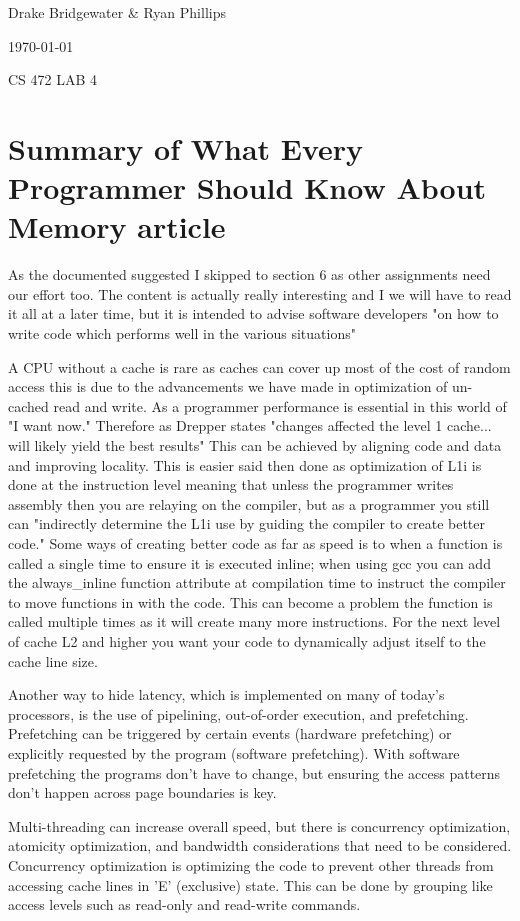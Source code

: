 \documentclass[letterpaper,12pt,titlepage]{article}
\def\name{Drake Bridgewater \& Ryan Phillips}
\begin{document}
\hfill \name

\hfill \today

\hfill CS 472 LAB 4

\section*{Summary of What Every Programmer Should Know About Memory article}
As the documented suggested I skipped to section 6 as other assignments need our effort too. The content is actually really interesting and I we will have to read it all at a later time, but it is intended to advise software developers "on how to write code which performs well in the various situations" \cite[p.~2]{Drepper}

A CPU without a cache is rare as caches can cover up most of the cost of random access this is due to the advancements we have made in optimization of un-cached read and write. As a programmer performance is essential in this world of "I want now." Therefore as Drepper states "changes affected the level 1 cache... will likely yield the best results" \cite[p.~49]{Drepper} This can be achieved by aligning code and data and improving locality. This is easier said then done as optimization of L1i is done at the instruction level meaning that unless the programmer writes assembly then you are relaying on the compiler, but as a programmer you still can "indirectly determine the L1i use by guiding the compiler to create better code." \cite[p.~55]{Drepper} Some ways of creating better code as far as speed is to when a function is called a single time to ensure it is executed inline; when using gcc you can add the always\_inline function attribute at compilation time to instruct the compiler to move functions in with the code. This can become a problem the function is called multiple times as it will create many more instructions. For the next level of cache L2 and higher you want your code to dynamically adjust itself to the cache line size.

Another way to hide latency, which is implemented on many of today's processors, is the use of pipelining, out-of-order execution, and prefetching. Prefetching can be triggered by certain
events (hardware prefetching) or explicitly requested by the program (software prefetching). \cite[p.~61]{Drepper} With software prefetching the programs don't have to change, but ensuring the access patterns don't happen across page boundaries is key.

Multi-threading can increase overall speed, but there is concurrency optimization, atomicity optimization, and bandwidth considerations that need to be considered. Concurrency optimization is optimizing the code to prevent other threads from accessing  cache lines in 'E' (exclusive) state. This can be done by grouping like access levels such as read-only and read-write commands.
\end{document}
